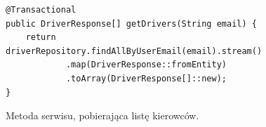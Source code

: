 \begin{figure}
\centering
\begin{lstlisting}
@Transactional
public DriverResponse[] getDrivers(String email) {
    return driverRepository.findAllByUserEmail(email).stream()
            .map(DriverResponse::fromEntity)
            .toArray(DriverResponse[]::new);
}
\end{lstlisting}
\caption{Metoda serwisu, pobierająca listę kierowców.}
\label{fig:kod:serviceGetDrivers}
\end{figure}
